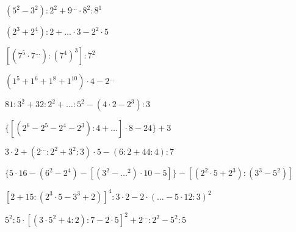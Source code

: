 \begin{esercizio} %
\((5^2-3^2):2^2+9^{\dots}\cdot8^2:8^1\) 
\end{esercizio}
\begin{esercizio} %
\((2^3+2^4):2+{\dots}\cdot3-2^2\cdot5\) 
\end{esercizio}
\begin{esercizio} %
\([(7^5\cdot7^{\dots}):(7^4)^3]:7^2\) 
\end{esercizio}
\begin{esercizio} %
\((1^5+1^6+1^8+1^{10})\cdot4-2^{\dots}\) 
\end{esercizio}
\begin{esercizio} %
\(81:3^2+32:2^2+{\dots}:5^2-(4\cdot2-2^3):3\) 
\end{esercizio}
\begin{esercizio} %
\(\{[(2^6-2^5-2^4-2^3):4+{\dots}]\cdot8-24\}+3\) 
\end{esercizio}
\begin{esercizio} %
\(3\cdot2+(2^{\dots}:2^2+3^2:3)\cdot5-(6:2+44:4):7\) 
\end{esercizio}
\begin{esercizio} %
\(\{5\cdot16-(6^2-2^4)-[(3^2-{\dots}^2)\cdot10-5]\}-[(2^2\cdot5+2^3):(3^3-5^2)
]\) 
\end{esercizio}
\begin{esercizio} %
\([2+15:(2^3\cdot5-3^3+2)]^4:3\cdot2-2\cdot({\dots}-5\cdot12:3)^2\) 
\end{esercizio}
\begin{esercizio} %
\(5^2:5\cdot[(3\cdot5^2+4:2):7-2\cdot5]^2+2^{\dots}:2^2-5^2:5\) 
\end{esercizio}
